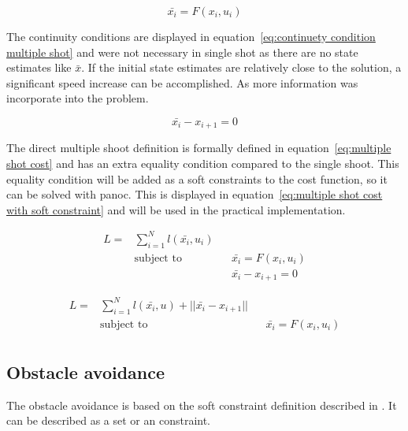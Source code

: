 			\begin{equation}
				\bar{x_i} = F(x_i,u_i)
				\label{eq:}
			\end{equation}
			
			The continuity conditions are displayed in equation~\ref{eq:continuety condition multiple shot} and were not necessary in single shot as there are no state estimates like $\bar{x}$. If the initial state estimates are relatively close to the solution, a significant speed increase can be accomplished. As more information was incorporate into the problem.
			
			\begin{equation}
				\bar{x_i} - x_{i+1} = 0
				\label{eq:continuety condition multiple shot}
			\end{equation}
			
			The direct multiple shoot definition is formally defined in equation~\ref{eq:multiple shot cost} and has an extra equality condition compared to the single shoot. This equality condition will be added as a soft constraints to the cost function, so it can be solved with panoc. This is displayed in equation~\ref{eq:multiple shot cost with soft constraint} and will be used in the practical implementation.
			
			\begin{equation}
				\begin{aligned}
				L =  & \sum_{i=1}^{N} l(\bar{x_i},u_i) \\
				& \text{subject to}			&& \bar{x_i} = F(x_i,u_i) \\
				& 							&& \bar{x_i} - x_{i+1} = 0
				\end{aligned}
				\label{eq:multiple shot cost}
			\end{equation}
			
			\begin{equation}
			\begin{aligned}
			L =  & \sum_{i=1}^{N} l(\bar{x_i},u) + ||\bar{x_i} - x_{i+1}||\\
			& \text{subject to}			&& \bar{x_i} = F(x_i,u_i) \\
			\end{aligned}
			\label{eq:multiple shot cost with soft constraint}
			\end{equation}
			
		\subsection{Obstacle avoidance}
			The obstacle avoidance is based on the soft constraint definition described in \cite{AjaySathya2017}. It can be described as a set or an constraint.
